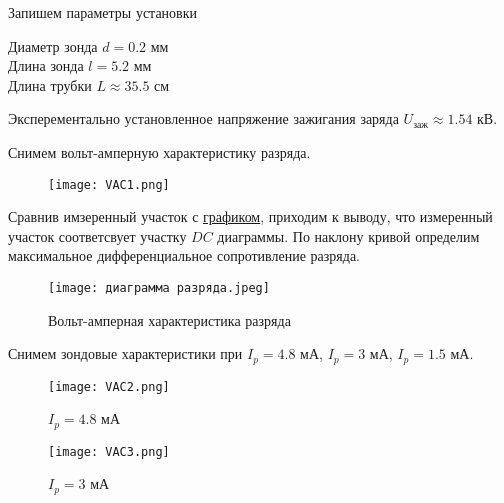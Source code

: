     Запишем параметры установки
    \begin{center}
        Диаметр зонда $d = 0.2$ мм \\
        Длина зонда $l = 5.2$ мм \\
        Длина трубки $L \approx 35.5$ см \\
    \end{center}

    Эксперементально установленное напряжение зажигания заряда $U_{\text{заж}} \approx 1.54$ кВ.

    Снимем вольт-амперную характеристику разряда.

    

    \begin{figure}
        \centering
        \texttt{[image: VAC1.png]}
    \end{figure}

    Сравнив имзеренный участок с \hyperref[diagram]{графиком}, приходим к выводу, что измеренный участок
    соответсвует участку $DC$ диаграммы. По наклону кривой определим максимальное
    дифференциальное сопротивление разряда.

    \begin{center}
    \end{center}

    \begin{figure}
        \centering
        \texttt{[image: диаграмма разряда.jpeg]}
        \caption{Вольт-амперная характеристика разряда}
        \label{diagram}
    \end{figure}

    Снимем зондовые характеристики при $I_p = 4.8$ мА, $I_p = 3$ мА, $I_p = 1.5$ мА.

    

    \begin{figure}
        \centering
        \texttt{[image: VAC2.png]}
        \caption{$I_p = 4.8$ мА}
    \end{figure}

    

    \begin{figure}
        \centering
        \texttt{[image: VAC3.png]}
        \caption{$I_p = 3$ мА}
    \end{figure}

    

